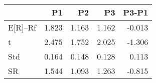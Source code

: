 \begin{tabular}{lrrrr}
\toprule
 & P1 & P2 & P3 & P3-P1 \\
\midrule
E[R]--Rf & 1.823 & 1.163 & 1.162 & -0.013 \\
t & 2.475 & 1.752 & 2.025 & -1.306 \\
Std & 0.164 & 0.148 & 0.128 & 0.113 \\
SR & 1.544 & 1.093 & 1.263 & -0.815 \\
\bottomrule
\end{tabular}
